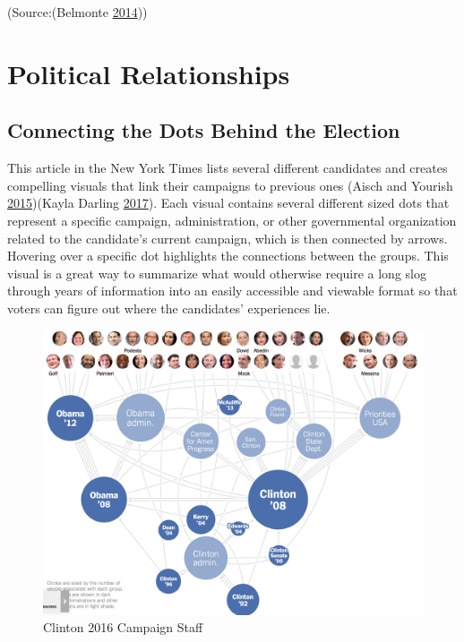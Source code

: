 \documentclass[]{book}
\theoremstyle{definition}
\theoremstyle{definition}
\theoremstyle{definition}
\theoremstyle{remark}
\begin{document}
(Source:(Belmonte \protect\hyperlink{ref-SotU2014}{2014}))

\section{Political Relationships}\label{political-relationships}

\subsection{Connecting the Dots Behind the
Election}\label{connecting-the-dots-behind-the-election}

This article in the New York Times lists several different candidates
and creates compelling visuals that link their campaigns to previous
ones (Aisch and Yourish
\protect\hyperlink{ref-campaign_staff}{2015})(Kayla Darling
\protect\hyperlink{ref-cool_data}{2017}). Each visual contains several
different sized dots that represent a specific campaign, administration,
or other governmental organization related to the candidate's current
campaign, which is then connected by arrows. Hovering over a specific
dot highlights the connections between the groups. This visual is a
great way to summarize what would otherwise require a long slog through
years of information into an easily accessible and viewable format so
that voters can figure out where the candidates' experiences lie.

\begin{figure}
\centering
\includegraphics{images/clinton_campaign.png}
\caption{Clinton 2016 Campaign Staff}
\end{figure}
\end{document}

